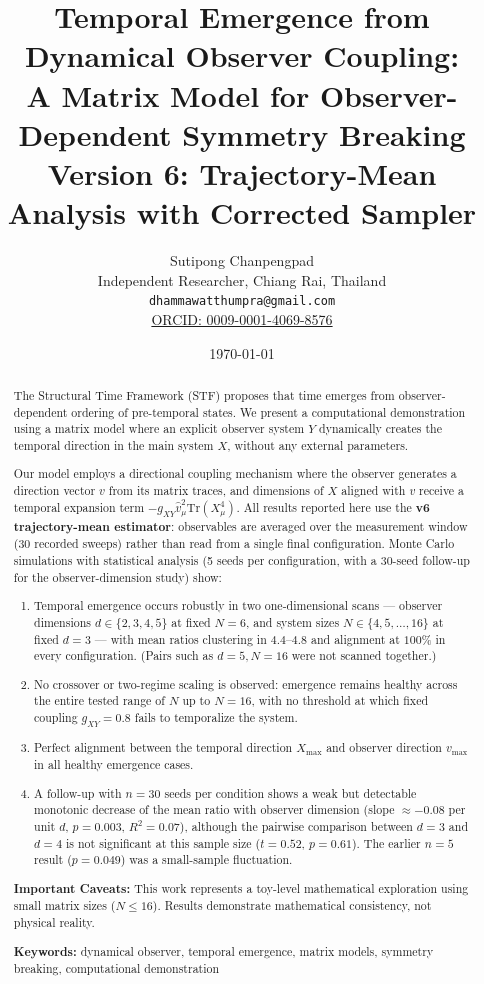 \documentclass[12pt,a4paper]{article}
\title{\textbf{Temporal Emergence from Dynamical Observer Coupling:\\
       A Matrix Model for Observer-Dependent Symmetry Breaking}\\[0.5cm]
       \large Version 6: Trajectory-Mean Analysis with Corrected Sampler}
\author{Sutipong Chanpengpad\\
\small Independent Researcher, Chiang Rai, Thailand\\
\small \texttt{dhammawatthumpra@gmail.com}\\
\small \href{https://orcid.org/0009-0001-4069-8576}{ORCID: 0009-0001-4069-8576}}
\date{\today}
\begin{document}
\maketitle

\begin{abstract}
The Structural Time Framework (STF) proposes that time emerges from 
observer-dependent ordering of pre-temporal states. We present a 
computational demonstration using a matrix model where an explicit 
observer system $Y$ dynamically creates the temporal direction in 
the main system $X$, without any external parameters.

Our model employs a directional coupling mechanism where the observer 
generates a direction vector $v$ from its matrix traces, and dimensions 
of $X$ aligned with $v$ receive a temporal expansion term 
$-g_{XY} \hat{v}_\mu^2 \text{Tr}(X_\mu^4)$. All results reported here use the
\textbf{v6 trajectory-mean estimator}: observables are averaged over the
measurement window (30 recorded sweeps) rather than read from a single final
configuration. Monte Carlo simulations with statistical analysis (5 seeds per
configuration, with a $30$-seed follow-up for the observer-dimension study)
show:

\begin{enumerate}[leftmargin=*]
\item Temporal emergence occurs robustly in two one-dimensional scans —
      observer dimensions $d \in \{2,3,4,5\}$ at fixed $N=6$, and system
      sizes $N \in \{4,5,\ldots,16\}$ at fixed $d=3$ — with
      mean ratios clustering in $4.4$--$4.8$ and alignment at $100\%$ in every
      configuration. (Pairs such as $d=5,N=16$ were not scanned together.)
\item No crossover or two-regime scaling is observed: emergence remains
      healthy across the entire tested range of $N$ up to $N=16$, with no
      threshold at which fixed coupling $g_{XY}=0.8$ fails to temporalize the
      system.
\item Perfect alignment between the temporal direction $X_{\max}$ and 
      observer direction $v_{\max}$ in all healthy emergence cases.
\item A follow-up with $n=30$ seeds per condition shows a weak but
      detectable monotonic decrease of the mean ratio with observer
      dimension (slope $\approx -0.08$ per unit $d$, $p=0.003$, $R^2=0.07$),
      although the pairwise comparison between $d=3$ and $d=4$ is not
      significant at this sample size ($t=0.52$, $p=0.61$). The earlier
      $n=5$ result ($p=0.049$) was a small-sample fluctuation.
\end{enumerate}

\textbf{Important Caveats:} This work represents a toy-level 
mathematical exploration using small matrix sizes ($N \leq 16$). 
Results demonstrate mathematical consistency, not physical reality.

\medskip
\noindent\textbf{Keywords:} dynamical observer, temporal emergence, 
matrix models, symmetry breaking, computational demonstration
\end{abstract}
\end{document}
